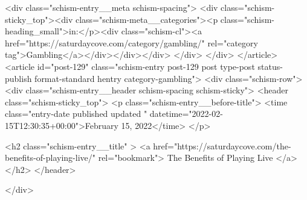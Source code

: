 {		<div class="schism-entry__meta schism-spacing">			<div class="schism-sticky_top"><div class="schism-meta__categories"><p class="schism-heading_small">in:</p><div class="schism-cl"><a href="https://saturdaycove.com/category/gambling/" rel="category tag">Gambling</a></div></div></div>		</div>
	</div>
</article>
<article id="post-129" class="schism-entry post-129 post type-post status-publish format-standard hentry category-gambling">
	<div class="schism-row">		<div class="schism-entry__header schism-spacing schism-sticky">			<header class="schism-sticky_top">				<p class="schism-entry__before-title">
					<time class="entry-date published updated " datetime="2022-02-15T12:30:35+00:00">February 15, 2022</time>				</p>

				<h2 class="schism-entry__title" >
					<a href="https://saturdaycove.com/the-benefits-of-playing-live/" rel="bookmark">
						The Benefits of Playing Live					</a>
				</h2>
			</header>

					</div>

}
